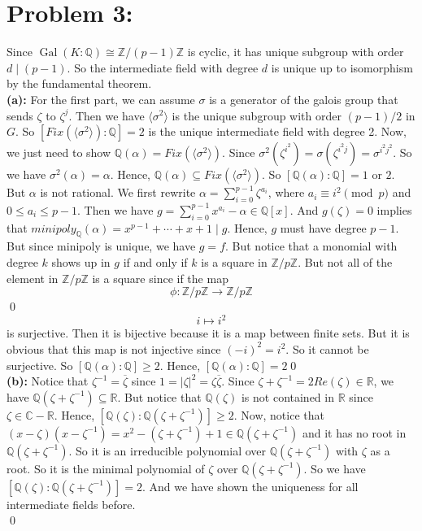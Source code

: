 \documentclass[12pt]{amsart}
\newcommand{\R}{\mathbb{R}}
\newcommand{\Q}{\mathbb{Q}}
\newcommand{\C}{\mathbb{C}}
\newcommand{\Z}{\mathbb{Z}}
\newcommand{\Gal}[0]{\operatorname{Gal}}
\begin{document}
\section*{Problem 3:} Since $\Gal(K:\Q)\cong \Z/(p-1)\Z$ is cyclic, it has unique subgroup with order $d\mid (p-1)$. So the intermediate field with degree $d$ is unique up to isomorphism by the fundamental theorem.
\\\textbf{(a):} For the first part, we can assume $\sigma$ is a generator of the galois group that sends $\zeta$ to $\zeta^j$. Then we have $\langle\sigma^2\rangle$ is the unique subgroup with order $(p-1)/2$ in $G$. So $[Fix(\langle\sigma^2\rangle):\Q]=2$ is the unique intermediate field with degree 2. Now, we just need to show $\Q(\alpha)=Fix(\langle\sigma^2\rangle)$. Since $\sigma^2(\zeta^{i^2})=\sigma(\zeta^{i^2j})=\sigma^{i^2j^2}$. So we have $\sigma^2(\alpha)=\alpha$. Hence, $\Q(\alpha)\subseteq Fix(\langle\sigma^2\rangle)$. So $[\Q(\alpha):\Q]=1$ or $ 2$. But $\alpha$ is not rational. We first rewrite $\alpha=\sum_{i=0}^{p-1}\zeta^{a_i}$, where $a_i\equiv i^2\pmod p$ and $0\leq a_i\leq p-1$. Then we have $g=\sum_{i=0}^{p-1}x^{a_i}-\alpha \in\Q[x]$. And $g(\zeta)=0$ implies that $minipoly_\Q(\alpha)=x^{p-1}+\cdots +x+1\mid g$. Hence, $g$ must have degree $p-1$. But since minipoly is unique, we have $g=f$. But notice that a monomial with degree $k$ shows up in $g$ if and only if $k$ is a square in $\Z/p\Z$. But not all of the element in $\Z/p\Z$ is a square since if the map 
\[\phi:\Z/p\Z\to\Z/p\Z\]\qed\\
\[i\mapsto i^2\]
is surjective. Then it is bijective because it is a map between finite sets. But it is obvious that this map is not injective since $(-i)^2=i^2$. So it cannot be surjective. So $[\Q(\alpha):\Q]\geq 2$. Hence, $[\Q(\alpha):\Q]= 2$\qed\\
\textbf{(b):} Notice that $\zeta^{-1}=\overline{\zeta}$ since $1=|\zeta|^2=\zeta\overline{\zeta}$. Since $\zeta+\zeta^{-1}=2Re(\zeta)\in\R$, we have $\Q(\zeta+\zeta^{-1})\subseteq \R$. But notice that $\Q(\zeta)$ is not contained in $\R$ since $\zeta\in\C-\R$. Hence, $[\Q(\zeta):\Q(\zeta+\zeta^{-1})]\geq 2$. Now, notice that $(x-\zeta)(x-\zeta^{-1})=x^2-(\zeta+\zeta^{-1})+1\in\Q(\zeta+\zeta^{-1})$ and it has no root in $\Q(\zeta+\zeta^{-1})$. So it is an irreducible polynomial over $\Q(\zeta+\zeta^{-1})$ with $\zeta$ as a root. So it is the minimal polynomial of $\zeta$ over $\Q(\zeta+\zeta^{-1})$. So we have $[\Q(\zeta):\Q(\zeta+\zeta^{-1})]=2$. And we have shown the uniqueness for all intermediate fields before.\\
\qed\\
\end{document}
